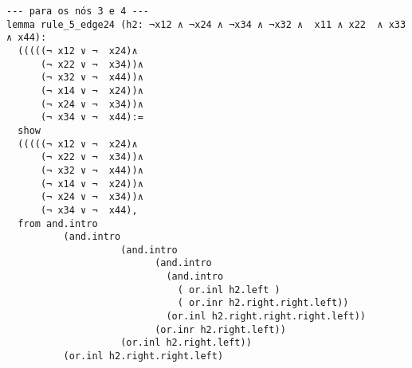 \begin{enumerate}
\begin{lstlisting}
--- para os nós 3 e 4 ---
lemma rule_5_edge24 (h2: ¬x12 ∧ ¬x24 ∧ ¬x34 ∧ ¬x32 ∧  x11 ∧ x22  ∧ x33 ∧ x44):
  (((((¬ x12 ∨ ¬  x24)∧
      (¬ x22 ∨ ¬  x34))∧ 
      (¬ x32 ∨ ¬  x44))∧ 
      (¬ x14 ∨ ¬  x24))∧ 
      (¬ x24 ∨ ¬  x34))∧ 
      (¬ x34 ∨ ¬  x44):=
  show
  (((((¬ x12 ∨ ¬  x24)∧
      (¬ x22 ∨ ¬  x34))∧ 
      (¬ x32 ∨ ¬  x44))∧ 
      (¬ x14 ∨ ¬  x24))∧ 
      (¬ x24 ∨ ¬  x34))∧ 
      (¬ x34 ∨ ¬  x44),
  from and.intro
          (and.intro
                    (and.intro
                          (and.intro
                            (and.intro
                              ( or.inl h2.left ) 
                              ( or.inr h2.right.right.left))
                            (or.inl h2.right.right.right.left))
                          (or.inr h2.right.left))
                    (or.inl h2.right.left))
          (or.inl h2.right.right.left)
\end{lstlisting}

\end{enumerate}
